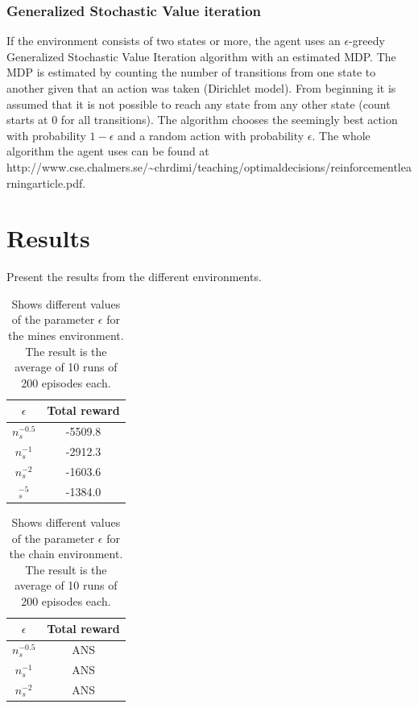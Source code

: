 \documentclass[11pt]{article}
\numberwithin{equation}{section}
\begin{document}
\begin{flushleft}
\subsubsection{Generalized Stochastic Value iteration}

If the environment consists of two states or more, the agent uses an $\epsilon$-greedy Generalized Stochastic Value Iteration algorithm with an estimated MDP. The MDP is estimated by counting the number of transitions from one state to another given that an action was taken (Dirichlet model). From beginning it is assumed that it is not possible to reach any state from any other state (count starts at 0 for all transitions). The algorithm chooses the seemingly best action with probability $1-\epsilon$ and a random action with probability $\epsilon$. The whole algorithm the agent uses can be found at http://www.cse.chalmers.se/\textasciitilde chrdimi/teaching/optimal\textunderscore decisions/reinforcement\textunderscore learning\textunderscore article.pdf.

\section{Results}

Present the results from the different environments.

\begin{table}[H]
\caption{Shows different values of the parameter $\epsilon$ for the mines environment. The result is the average of 10 runs of 200 episodes each.}
\begin{center}
\begin{tabular}{|c|c|}
\hline
$\epsilon$ & Total reward \\ \hline
$n_s^{-0.5}$ & -5509.8 \\ \hline
$n_s^{-1}$ & -2912.3 \\ \hline
$n_s^{-2}$ & -1603.6 \\ \hline
$_s^{-5}$ & -1384.0 \\
\hline
\end{tabular}
\label{tab:minesMean}
\end{center}
\end{table}

\begin{table}[H]
\caption{Shows different values of the parameter $\epsilon$ for the chain environment. The result is the average of 10 runs of 200 episodes each.}
\begin{center}
\begin{tabular}{|c|c|}
\hline
$\epsilon$ & Total reward \\ \hline
$n_s^{-0.5}$ & ANS \\ \hline
$n_s^{-1}$ & ANS \\ \hline
$n_s^{-2}$ & ANS \\
\hline
\end{tabular}
\label{tab:chainMean}
\end{center}
\end{table}


\end{flushleft}
\end{document}
